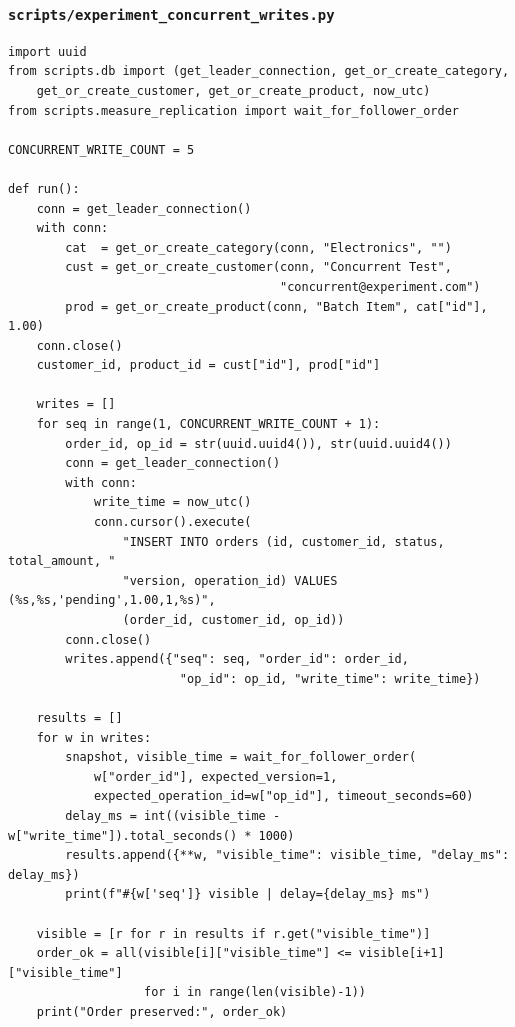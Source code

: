 \documentclass[12pt,a4paper]{article}
\begin{document}
\subsubsection{\texttt{scripts/experiment\_concurrent\_writes.py}}
\begin{lstlisting}[style=pythonstyle]
import uuid
from scripts.db import (get_leader_connection, get_or_create_category,
    get_or_create_customer, get_or_create_product, now_utc)
from scripts.measure_replication import wait_for_follower_order

CONCURRENT_WRITE_COUNT = 5

def run():
    conn = get_leader_connection()
    with conn:
        cat  = get_or_create_category(conn, "Electronics", "")
        cust = get_or_create_customer(conn, "Concurrent Test",
                                      "concurrent@experiment.com")
        prod = get_or_create_product(conn, "Batch Item", cat["id"], 1.00)
    conn.close()
    customer_id, product_id = cust["id"], prod["id"]

    writes = []
    for seq in range(1, CONCURRENT_WRITE_COUNT + 1):
        order_id, op_id = str(uuid.uuid4()), str(uuid.uuid4())
        conn = get_leader_connection()
        with conn:
            write_time = now_utc()
            conn.cursor().execute(
                "INSERT INTO orders (id, customer_id, status, total_amount, "
                "version, operation_id) VALUES (%s,%s,'pending',1.00,1,%s)",
                (order_id, customer_id, op_id))
        conn.close()
        writes.append({"seq": seq, "order_id": order_id,
                        "op_id": op_id, "write_time": write_time})

    results = []
    for w in writes:
        snapshot, visible_time = wait_for_follower_order(
            w["order_id"], expected_version=1,
            expected_operation_id=w["op_id"], timeout_seconds=60)
        delay_ms = int((visible_time - w["write_time"]).total_seconds() * 1000)
        results.append({**w, "visible_time": visible_time, "delay_ms": delay_ms})
        print(f"#{w['seq']} visible | delay={delay_ms} ms")

    visible = [r for r in results if r.get("visible_time")]
    order_ok = all(visible[i]["visible_time"] <= visible[i+1]["visible_time"]
                   for i in range(len(visible)-1))
    print("Order preserved:", order_ok)
\end{lstlisting}
\end{document}
